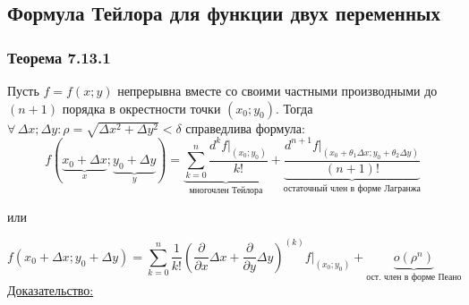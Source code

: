 \documentclass[12pt]{article}
\begin{document}
    \subsection{Формула Тейлора для функции двух переменных}
    \subsubsection*{Теорема 7.13.1}\label{th:7.13.1}
    Пусть $f = f(x;y)$ непрерывна вместе со своими частными производными до $(n+1)$ порядка в окрестности точки $(x_0; y_0)$. Тогда $\forall\, \Delta x; \Delta y : \rho = \sqrt{\Delta x^2 + \Delta y^2} < \delta$ справедлива формула:
    \[ f(\underbrace{x_0 + \Delta x}_{x}; \underbrace{y_0 + \Delta y}_{y}) = \underbrace{ \sum_{k=0}^{n} \frac{d^k f \Big|_{(x_0; y_0)}}{k!} }_{\text{многочлен Тейлора}} + \underbrace{ \frac{d^{n+1} f \Big|_{(x_0 + \theta_1 \Delta x; y_0 + \theta_2 \Delta y)}}{(n+1)!} }_{\text{остаточный член в форме Лагранжа}} \]
    \begin{center}
        или
    \end{center}
    \[ f(x_0 + \Delta x; y_0 + \Delta y) = \sum_{k=0}^{n} \frac{1}{k!}\left( \frac{\partial }{\partial x}\Delta x + \frac{\partial }{\partial y}\Delta y \right)^{(k)} f \Big|_{(x_0; y_0)} + \underbrace{o(\rho^n)}_{\text{ост. член в форме Пеано}} \]
    \underline{Доказательство:}
\end{document}
